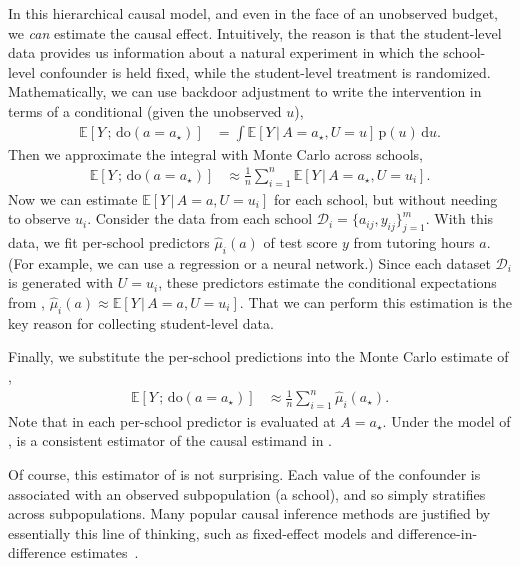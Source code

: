 \documentclass[12pt]{article}
\newcommand{\Dc}{\mathcal{D}}
\newcommand{\E}[1]{\mathbb{E}\left[ #1 \right]}
\newcommand{\rmdo}{\mathrm{do}}
\newcommand{\s}{\, ; \,}
\newcommand{\g}{\,\vert\,}
\newcommand{\di}{\mathrm{d}}
\newcommand{\pr}{\mathrm{p}}
\begin{document}
In this hierarchical causal model, and even in the face of an
unobserved budget, we \textit{can} estimate the causal effect. 
Intuitively, the reason is that the student-level data provides us information about a natural experiment in which the school-level confounder is held fixed, while the student-level treatment is randomized.
Mathematically,
we can use backdoor adjustment to write the intervention in terms of a
conditional (given the unobserved $u$),
\begin{align}
  \label{eq:intro_estimand}
  \E{Y \s \rmdo(a = a_\star)}
  &=
    \int
    \E{Y \g A = a_\star, U = u} \,
    \pr(u) \,
    \di u.
\end{align}
Then we approximate the integral with Monte Carlo across schools,
\begin{align}
  \label{eq:intro_mc_estimate}
  \E{Y \s \rmdo(a = a_\star)}
  &\approx
    \frac{1}{n}
    \sum_{i=1}^{n}
    \E{Y \g A = a_\star, U = u_i}.
\end{align}
Now we can estimate $\E{Y \g A = a, U = u_i}$ for each school, but
without needing to observe $u_i$. Consider the data from each school
$\Dc_i = \{a_{ij}, y_{ij}\}_{j=1}^{m}$. With this data, we fit
per-school predictors $\hat{\mu}_i(a)$ of test score $y$ from tutoring
hours $a$. (For example, we can use a regression or a neural network.)
Since each dataset $\Dc_i$ is generated with $U=u_i$, these predictors
estimate the conditional expectations from
,
$\hat{\mu}_i(a) \approx \E{Y \g A = a, U = u_i}$. That we can perform
this estimation is the key reason for collecting student-level data.

Finally, we substitute the per-school predictions into the Monte Carlo estimate of ,
\begin{align}
  \label{eq:intro_estimator}
  \E{Y \s \rmdo(a = a_\star)}
  &\approx
    \frac{1}{n}
    \sum_{i=1}^{n}
    \hat{\mu}_i(a_\star).
\end{align}
Note that in  each per-school predictor is evaluated at $A=a_\star$. Under the model of ,  is a consistent estimator of the causal estimand in .



Of course, this estimator of  is not
surprising. Each value of the confounder is associated with an
observed subpopulation (a school), and so 
simply stratifies across subpopulations. Many popular causal inference methods are
justified by essentially this line of thinking, such as fixed-effect models
and difference-in-difference
estimates~\citep{Wooldridge2005-bk,Angrist2009-ah,Goetgeluk2008-tm,Neuhaus1998-eq,Jensen2020-ds}.
\end{document}
